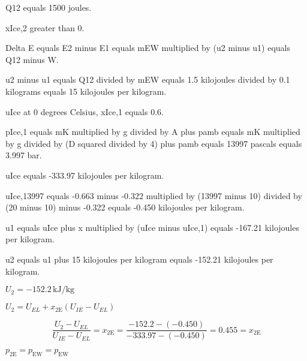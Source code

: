 Q12 equals 1500 joules.  

xIce,2 greater than 0.  

Delta E equals E2 minus E1 equals mEW multiplied by (u2 minus u1) equals Q12 minus W.  

u2 minus u1 equals Q12 divided by mEW equals 1.5 kilojoules divided by 0.1 kilograms equals 15 kilojoules per kilogram.  

uIce at 0 degrees Celsius, xIce,1 equals 0.6.  

pIce,1 equals mK multiplied by g divided by A plus pamb equals mK multiplied by g divided by (D squared divided by 4) plus pamb equals 13997 pascals equals 3.997 bar.  

uIce equals -333.97 kilojoules per kilogram.  

uIce,13997 equals -0.663 minus -0.322 multiplied by (13997 minus 10) divided by (20 minus 10) minus -0.322 equals -0.450 kilojoules per kilogram.  

u1 equals uIce plus x multiplied by (uIce minus uIce,1) equals -167.21 kilojoules per kilogram.  

u2 equals u1 plus 15 kilojoules per kilogram equals -152.21 kilojoules per kilogram.

\( U_2 = -152.2 \, \text{kJ/kg} \)  

\( U_2 = U_{EL} + x_{2\text{E}} (U_{IE} - U_{EL}) \)  

\[
\frac{U_2 - U_{EL}}{U_{IE} - U_{EL}} = x_{2\text{E}} = \frac{-152.2 - (-0.450)}{-333.97 - (-0.450)} = 0.455 = x_{2\text{E}}
\]  

\( p_{2\text{E}} = p_{\text{EW}} = p_{\text{EW}} \)